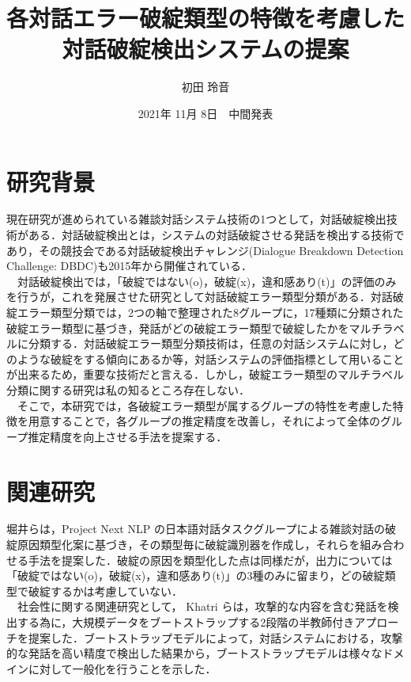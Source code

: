 \documentclass[upLaTex, 10pt,dvipdfmx,a4paper,twocolumn]{jsarticle}
\begin{document}
\title{各対話エラー破綻類型の特徴を考慮した対話破綻検出システムの提案}
\author{初田 玲音}
\date{2021年 11月 8日　中間発表}


\maketitle

\section{研究背景}
    現在研究が進められている雑談対話システム技術の1つとして，対話破綻検出技術がある．対話破綻検出とは，システムの対話破綻させる発話を検出する技術であり，その競技会である対話破綻検出チャレンジ(Dialogue Breakdown Detection Challenge: DBDC)も2015年から開催されている\cite{higashinaka}．\\
    　対話破綻検出では，「破綻ではない(o)，破綻(x)，違和感あり(t)」の評価のみを行うが，これを発展させた研究として対話破綻エラー類型分類がある\cite{araki}．対話破綻エラー類型分類では，2つの軸で整理された8グループに，17種類に分類された破綻エラー類型に基づき，発話がどの破綻エラー類型で破綻したかをマルチラベルに分類する．対話破綻エラー類型分類技術は，任意の対話システムに対し，どのような破綻をする傾向にあるか等，対話システムの評価指標として用いることが出来るため，重要な技術だと言える．しかし，破綻エラー類型のマルチラベル分類に関する研究は私の知るところ存在しない．\\
    　そこで，本研究では，各破綻エラー類型が属するグループの特性を考慮した特徴を用意することで，各グループの推定精度を改善し，それによって全体のグループ推定精度を向上させる手法を提案する．
    　

\section{関連研究}
    堀井ら\cite{hori}は，Project Next NLP の日本語対話タスクグループによる雑談対話の破綻原因類型化案に基づき，その類型毎に破綻識別器を作成し，それらを組み合わせる手法を提案した．破綻の原因を類型化した点は同様だが，出力については「破綻ではない(o)，破綻(x)，違和感あり(t)」の3種のみに留まり，どの破綻類型で破綻するかは考慮していない．\\
    　社会性に関する関連研究として， Khatri ら\cite{K}は，攻撃的な内容を含む発話を検出する為に，大規模データをブートストラップする2段階の半教師付きアプローチを提案した．ブートストラップモデルによって，対話システムにおける，攻撃的な発話を高い精度で検出した結果から，ブートストラップモデルは様々なドメインに対して一般化を行うことを示した．
\end{document}
